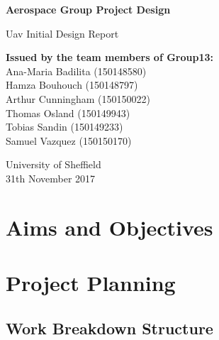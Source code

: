 \documentclass[12pt]{article}
\begin{document}
\begin{titlepage}
    \begin{center}
        \vspace*{1cm}
        
        \textbf{\Huge{Aerospace Group Project Design}}
        
        \vspace{0.5cm}
        \LARGE{Uav Initial Design Report}
        
        \vspace{1.5cm}
        
        \normalsize{\textbf{Issued by the team members of Group13:}\\
        Ana-Maria Badilita (150148580)\\
        Hamza Bouhouch (150148797)\\
        Arthur Cunningham (150150022)\\
        Thomas Osland (150149943)\\
        Tobias Sandin (150149233)\\
        Samuel Vazquez (150150170)}
        
        \vfill
        
        \vspace{0.8cm}
        
        University of Sheffield\\
        31th November 2017
        
    \end{center}
\end{titlepage}

\newpage



\tableofcontents

\newpage

\section{Aims and Objectives}

\newpage

\section{Project Planning}

\subsection{Work Breakdown Structure}
\end{document}

